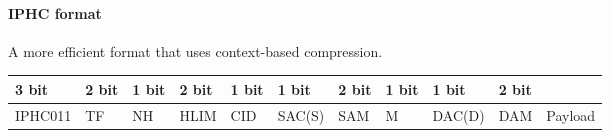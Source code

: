 \documentclass[a4paper, 12pt]{book} %
\begin{document}
\paragraph{IPHC format}\label{iphc-format}

A more efficient format that uses context-based compression.

\begin{longtable}[]{@{}
  >{\raggedright\arraybackslash}p{}
  >{\raggedright\arraybackslash}p{}
  >{\raggedright\arraybackslash}p{}
  >{\raggedright\arraybackslash}p{}
  >{\raggedright\arraybackslash}p{}
  >{\raggedright\arraybackslash}p{}
  >{\raggedright\arraybackslash}p{}
  >{\raggedright\arraybackslash}p{}
  >{\raggedright\arraybackslash}p{}
  >{\raggedright\arraybackslash}p{}
  >{\raggedright\arraybackslash}p{}@{}}
\toprule\noalign{}
\begin{minipage}[b]{\linewidth}\raggedright
3 bit
\end{minipage} & \begin{minipage}[b]{\linewidth}\raggedright
2 bit
\end{minipage} & \begin{minipage}[b]{\linewidth}\raggedright
1 bit
\end{minipage} & \begin{minipage}[b]{\linewidth}\raggedright
2 bit
\end{minipage} & \begin{minipage}[b]{\linewidth}\raggedright
1 bit
\end{minipage} & \begin{minipage}[b]{\linewidth}\raggedright
1 bit
\end{minipage} & \begin{minipage}[b]{\linewidth}\raggedright
2 bit
\end{minipage} & \begin{minipage}[b]{\linewidth}\raggedright
1 bit
\end{minipage} & \begin{minipage}[b]{\linewidth}\raggedright
1 bit
\end{minipage} & \begin{minipage}[b]{\linewidth}\raggedright
2 bit
\end{minipage} & \begin{minipage}[b]{\linewidth}\raggedright
\end{minipage} \\
\midrule\noalign{}
\endhead
\bottomrule\noalign{}
\endlastfoot
IPHC011 & TF & NH & HLIM & CID & SAC(S) & SAM & M & DAC(D) & DAM &
Payload \\
\end{longtable}
\end{document}
